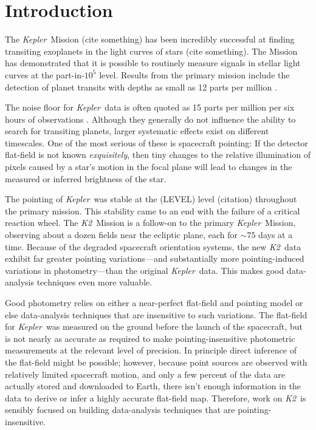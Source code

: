 \documentclass[12pt,preprint]{aastex}
\newcommand{\project}[1]{\textsl{#1}} %
\newcommand{\kepler}{\project{Kepler}}
\newcommand{\KT}{\project{K2}}
\begin{document}

\section{Introduction}

The \kepler\ Mission (cite something) has been incredibly successful at
finding transiting exoplanets in the light curves of stars (cite something).
The Mission has demonstrated that it is possible to routinely measure signals
in stellar light curves at the part-in-$10^5$ level.
Results from the primary mission include the detection of planet transits with
depths as small as 12 parts per million \citep{Barclay:2013}.

The noise floor for \kepler\ data is often quoted as 15 parts per million per
six hours of observations \citep{Gilliland:2011}.
Although they generally do not influence the ability to search for transiting
planets, larger systematic effects exist on different timescales.
One of the most serious of these is spacecraft pointing: If the detector
flat-field is not known \emph{exquisitely}, then tiny changes to the relative
illumination of pixels caused by a star's motion in the focal plane will lead
to changes in the measured or inferred brightness of the star.

The pointing of \kepler\ was stable at the (LEVEL) level (citation) throughout
the primary mission.
This stability came to an end with the failure of a critical reaction wheel.
The \KT\ Mission \citep{Howell:2014} is a follow-on to the primary \kepler\
Mission, observing about a dozen fields near the ecliptic plane, each for
$\sim 75$ days at a time.
Because of the degraded spacecraft orientation systems, the new \KT\ data
exhibit far greater pointing variations---and substantially more
pointing-induced variations in photometry---than the original \kepler\ data.
This makes good data-analysis techniques even more valuable.

Good photometry relies on either a near-perfect flat-field
and pointing model or else data-analysis techniques that are
insensitive to such variations.
The flat-field for \kepler\ was measured on the ground before the launch of
the spacecraft, but is not nearly as accurate as required to make
pointing-insensitive photometric measurements at the relevant level of precision.
In principle direct inference of the flat-field might be possible;
however, because point sources are observed with relatively limited
spacecraft motion, and only a few percent of the data are actually stored and
downloaded to Earth, there isn't enough information in the data to derive or
infer a highly accurate flat-field map.
Therefore, work on \KT\ is sensibly focused on building data-analysis
techniques that are pointing-insensitive.
\end{document}
